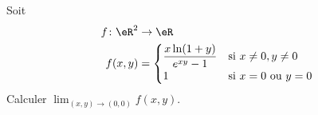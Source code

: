 \begin{exercice}[\boringexo]\label{exoLimiteContinue0007}

Soit 
\begin{equation}
	\begin{aligned}
		f\colon \eR^2&\to \eR \\
		f(x,y)&=
		\begin{cases}
			\displaystyle\frac{x \ln(1+y)}{e^{xy}-1}	&	\text{si }x\neq  0,y\neq 0\\
            1	&	 \text{si }x=0 \text{ ou } y=0
		\end{cases}
	\end{aligned}
\end{equation}
Calculer $\lim_{(x,y)\to(0,0)}f(x,y)$.

\end{exercice}
